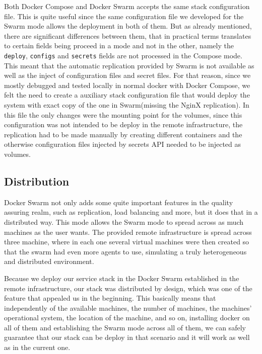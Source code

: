 \documentclass[12pt]{article}
\begin{document}
Both Docker Compose and Docker Swarm accepts the same stack configuration file. This is quite useful since the same configuration file we developed for the Swarm mode allows the deployment in both of them. But as already mentioned, there are significant differences between them, that in practical terms translates to certain fields being proceed in a mode and not in the other, namely the \texttt{deploy}, \texttt{configs} and \texttt{secrets} fields are not processed in the Compose mode. This meant that the automatic replication provided by Swarm is not available as well as the inject of configuration files and secret files. For that reason, since we mostly debugged and tested locally in normal docker with Docker Compose, we felt the need to create a auxiliary stack configuration file that would deploy the system with exact copy of the one in Swarm(missing the NginX replication). In this file the only changes were the mounting point for the volumes, since this configuration was not intended to be deploy in the remote infrastructure, the replication had to be made manually by creating different containers and the otherwise configuration files injected by secrets API needed to be injected as volumes.

\subsection{Distribution} \label{strategy.distribution} %

Docker Swarm not only adds some quite important features in the quality assuring realm, such as replication, load balancing and more, but it does that in a distributed way. This mode allows the Swarm mode to spread across as much machines as the user wants. The provided remote infrastructure is spread across three machine, where in each one several virtual machines were then created so that the swarm had even more agents to use, simulating a truly heterogeneous and distributed environment.

Because we deploy our service stack in the Docker Swarm established in the remote infrastructure, our stack was distributed by design, which was one of the feature that appealed us in the beginning. This basically means that independently of the available machines, the number of machines, the machines' operational system, the location of the machine, and so on, installing docker on all of them and establishing the Swarm mode across all of them, we can safely guarantee that our stack can be deploy in that scenario and it will work as well as in the current one.
\end{document}
